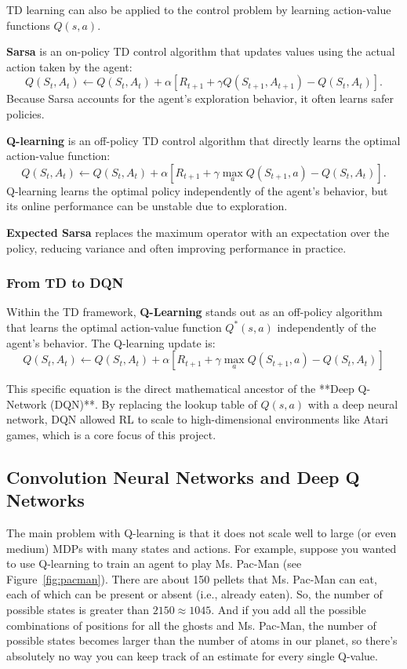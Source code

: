 TD learning can also be applied to the control problem by learning action-value functions $Q(s,a)$.

\textbf{Sarsa} is an on-policy TD control algorithm that updates values using the actual action taken by the agent:
\[
Q(S_t, A_t) \leftarrow Q(S_t, A_t) + \alpha \left[ R_{t+1} + \gamma Q(S_{t+1}, A_{t+1}) - Q(S_t, A_t) \right].
\]
Because Sarsa accounts for the agent’s exploration behavior, it often learns safer policies.




\textbf{Q-learning} is an off-policy TD control algorithm that directly learns the optimal action-value function:
\[
Q(S_t, A_t) \leftarrow Q(S_t, A_t) + \alpha \left[ R_{t+1} + \gamma \max_a Q(S_{t+1}, a) - Q(S_t, A_t) \right].
\]
Q-learning learns the optimal policy independently of the agent’s behavior, but its online performance can be unstable due to exploration.




\textbf{Expected Sarsa} replaces the maximum operator with an expectation over the policy, reducing variance and often improving performance in practice.





\subsubsection{From TD to DQN}
Within the TD framework, \textbf{Q-Learning} stands out as an off-policy algorithm that learns the optimal action-value function $Q^*(s, a)$ independently of the agent's behavior. The Q-learning update is:
$$Q(S_t, A_t) \leftarrow Q(S_t, A_t) + \alpha [R_{t+1} + \gamma \max_a Q(S_{t+1}, a) - Q(S_t, A_t)]$$

This specific equation is the direct mathematical ancestor of the **Deep Q-Network (DQN)**. By replacing the lookup table of $Q(s, a)$ with a deep neural network, DQN allowed RL to scale to high-dimensional environments like Atari games, which is a core focus of this project.


\subsection{Convolution Neural Networks and Deep Q Networks}

The main problem with Q-learning is that it does not scale well to large (or even medium) MDPs with many states and actions. For example, suppose you wanted to use Q-learning to train an agent to play Ms. Pac-Man (see Figure~\ref{fig:pacman}). There are about 150 pellets that Ms. Pac-Man can eat, each of which can be present or absent (i.e., already eaten). So, the number of possible states is greater than $2150 \approx 1045$. And if you add all the possible combinations of positions for all the ghosts and Ms. Pac-Man, the number of possible states becomes larger than the number of atoms in our planet, so there’s absolutely no way you can keep track of an estimate for every single Q-value. \cite{geron}

